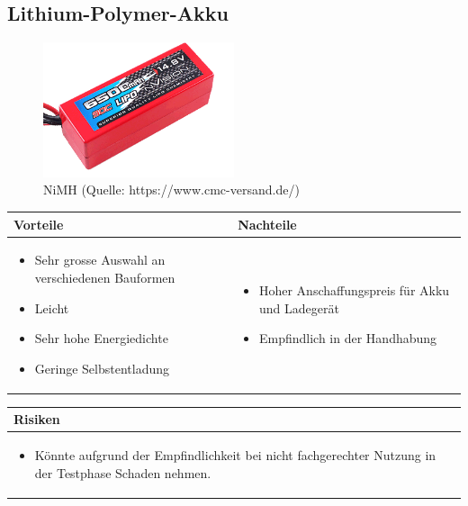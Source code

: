 \pagebreak


\subsection{Lithium-Polymer-Akku}


\begin{figure}[h!]%
\centering
\includegraphics[width=0.5\textwidth]{fig/lipo.png}
\caption{NiMH (Quelle: https://www.cmc-versand.de/)}
\label{fig:Java}
\end{figure}

\begin{table}[h]
\begin{tabular}{p{} | p{}}


 \textbf{Vorteile} & \textbf{Nachteile} \\ \hline
	 
\begin{itemize}
\item Sehr grosse Auswahl an verschiedenen Bauformen
\item Leicht
\item Sehr hohe Energiedichte
\item Geringe Selbstentladung
\end{itemize}

 
 &
 
\begin{itemize}
\item Hoher Anschaffungspreis für Akku und Ladegerät
\item Empfindlich in der Handhabung
\end{itemize}

\end{tabular}
\end{table}

\begin{table}[h]
\begin{tabular}{p{}p{}}


 \textbf{Risiken} & \\ \hline
	 
\begin{itemize}
\item Könnte aufgrund der Empfindlichkeit bei nicht fachgerechter Nutzung in der Testphase Schaden nehmen.
\end{itemize}

 
\end{tabular}
\end{table}

\pagebreak